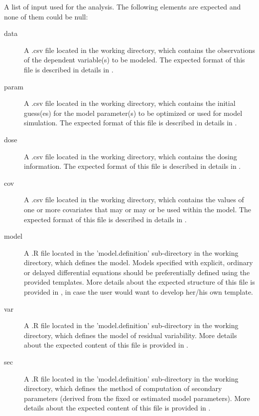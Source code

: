\begin{Arguments}
\begin{ldescription}
\item[\code{files}] A list of input used for the analysis. The following elements are
expected and none of them could be null: \begin{description}

\item[data] A .csv file located in the working directory, which contains
the observations of the dependent variable(s) to be modeled. The
expected format of this file is described in details in
.
\item[param] A .csv file located in the working directory, which contains
the initial guess(es) for the model parameter(s) to be optimized or used
for model simulation. The expected format of this file is described in
details in .
\item[dose] A .csv file located in the working directory, which contains
the dosing information. The expected format of this file is described in
details in .
\item[cov] A .csv file located in the working directory, which contains
the values of one or more covariates that may or may or be used within
the model. The expected format of this file is described in details in
.
\item[model] A .R file located in the 'model.definition'
sub-directory in the working directory, which defines the model. Models
specified with explicit, ordinary or delayed differential equations
should be preferentially defined using the provided templates. More
details about the expected structure of this file is provided in
, in case the user would
want to develop her/his own template.
\item[var] A .R file located in the 'model.definition' sub-directory
in the working directory, which defines the model of residual
variability. More details about the expected content of this file is
provided in .
\item[sec] A .R file located in the 'model.definition' sub-directory
in the working directory, which defines the method of computation of
secondary parameters (derived from the fixed or estimated model
parameters). More details about the expected content of this file is
provided in .


\end{description}
\end{ldescription}
\end{Arguments}

